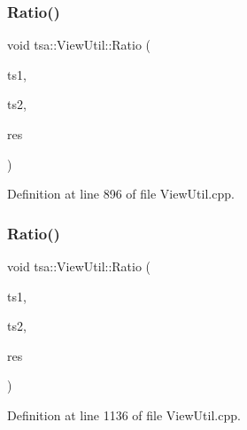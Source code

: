 \subsubsection{\texorpdfstring{Ratio()}{Ratio()}\hspace{0.1cm}{\footnotesize\ttfamily [2/4]}}
{\footnotesize\ttfamily void tsa\+::\+View\+Util\+::\+Ratio (\begin{DoxyParamCaption}\item[{\hyperlink{namespacetsa_ab32775c889b53c40fa83939f22372b75}{Seq\+View\+Complex} \&}]{ts1,  }\item[{\hyperlink{namespacetsa_ab32775c889b53c40fa83939f22372b75}{Seq\+View\+Complex} \&}]{ts2,  }\item[{\hyperlink{namespacetsa_ab32775c889b53c40fa83939f22372b75}{Seq\+View\+Complex} \&}]{res }\end{DoxyParamCaption})\hspace{0.3cm}{\ttfamily [static]}}



Definition at line 896 of file View\+Util.\+cpp.

\mbox{\label{classtsa_1_1_view_util_a93b25c30e8e78f0392eec2d09eb3e8fe}} 
\subsubsection{\texorpdfstring{Ratio()}{Ratio()}\hspace{0.1cm}{\footnotesize\ttfamily [3/4]}}
{\footnotesize\ttfamily void tsa\+::\+View\+Util\+::\+Ratio (\begin{DoxyParamCaption}\item[{\hyperlink{namespacetsa_ac599574bcc094eda25613724b8f3ca9e}{Seq\+View\+Double} \&}]{ts1,  }\item[{\hyperlink{namespacetsa_ab32775c889b53c40fa83939f22372b75}{Seq\+View\+Complex} \&}]{ts2,  }\item[{\hyperlink{namespacetsa_ab32775c889b53c40fa83939f22372b75}{Seq\+View\+Complex} \&}]{res }\end{DoxyParamCaption})\hspace{0.3cm}{\ttfamily [static]}}



Definition at line 1136 of file View\+Util.\+cpp.

\mbox{\label{classtsa_1_1_view_util_a0850a008ea672b836c640b7211b074d1}} 
